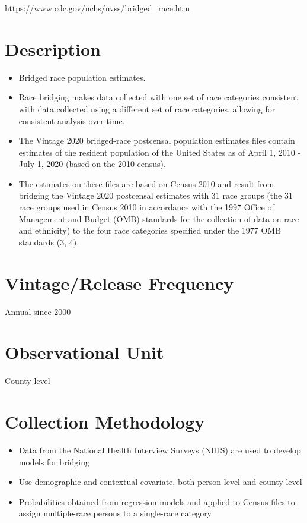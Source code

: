 \documentclass[
]{book}
\providecommand{\tightlist}{%
  \setlength{\itemsep}{0pt}\setlength{\parskip}{0pt}}
\begin{document}
\url{https://www.cdc.gov/nchs/nvss/bridged_race.htm}

\hypertarget{description-13}{%
\section{Description}\label{description-13}}

\begin{itemize}
\tightlist
\item
  Bridged race population estimates.
\item
  Race bridging makes data collected with one set of race categories consistent with data collected using a different set of race categories, allowing for consistent analysis over time.
\item
  The Vintage 2020 bridged-race postcensal population estimates files contain estimates of the resident population of the United States as of April 1, 2010 - July 1, 2020 (based on the 2010 census).
\item
  The estimates on these files are based on Census 2010 and result from bridging the Vintage 2020 postcensal estimates with 31 race groups (the 31 race groups used in Census 2010 in accordance with the 1997 Office of Management and Budget (OMB) standards for the collection of data on race and ethnicity) to the four race categories specified under the 1977 OMB standards (3, 4).
\end{itemize}

\hypertarget{vintagerelease-frequency-13}{%
\section{Vintage/Release Frequency}\label{vintagerelease-frequency-13}}

Annual since 2000

\hypertarget{observational-unit-13}{%
\section{Observational Unit}\label{observational-unit-13}}

County level

\hypertarget{collection-methodology-13}{%
\section{Collection Methodology}\label{collection-methodology-13}}

\begin{itemize}
\tightlist
\item
  Data from the National Health Interview Surveys (NHIS) are used to develop models for bridging
\item
  Use demographic and contextual covariate, both person-level and county-level
\item
  Probabilities obtained from regression models and applied to Census files to assign multiple-race persons to a single-race category
\end{itemize}
\end{document}
